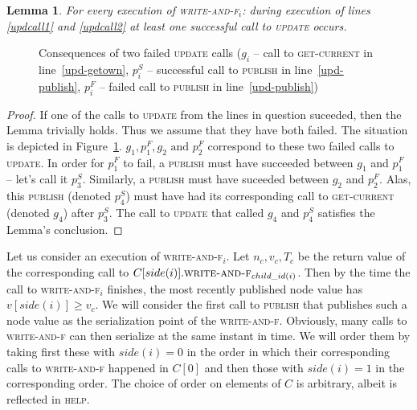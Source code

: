 \documentclass[a4paper,11pt]{article}
\newcommand{\atomic}[4]{\node(lab#1) at (#3,-#4+0.5) {#2};\draw (#3,-#4-0.1) to (lab#1);\node[inner sep=0pt](#1) at (#3,-#4) {};}
\newtheorem{lemma}{Lemma}
\newcommand{\fn}[1]{\textsc{#1}}
\begin{document}
\begin{lemma}
	For every execution of \fn{write-and-f$_i$}: during execution of lines \ref{updcall1} and \ref{updcall2} at least one successful call to \fn{update} occurs.
\end{lemma}
\begin{figure}
\caption{Consequences of two failed \fn{update} calls ($g_i$ -- call to \fn{get-current} in line~\ref{upd-getown}, $p^S_{i}$ -- successful call to \fn{publish} in line~\ref{upd-publish}, $p^F_{i}$ -- failed call to \fn{publish} in line~\ref{upd-publish})}
\label{fig-only-two-pubs}
\end{figure}

\begin{proof}
	If one of the calls to \fn{update} from the lines in question suceeded, then the Lemma trivially holds. Thus we assume that they have both failed. The situation is depicted
	in Figure~\ref{fig-only-two-pubs}. $g_1, p^F_1, g_2 \text{ and } p^F_2$ correspond to these two failed calls to \fn{update}. In order for $p^F_1$ to fail, a \fn{publish} must have
	succeeded between $g_1$ and $p^F_1$ -- let's call it $p^S_3$. Similarly, a \fn{publish} must have suceeded between $g_2$ and $p^F_2$. Alas, this \fn{publish} (denoted $p^S_4$) must have had
	its corresponding call to \fn{get-current} (denoted $g_4$) after $p^S_3$. The call to \fn{update} that called $g_4$ and $p^S_4$ satisfies the Lemma's conclusion.
\end{proof}

Let us consider an execution of \fn{write-and-f$_i$}. Let $n_c, v_c, T_c$ be the return value of the corresponding call to $C[side(i)].\fn{write-and-f$_{child\_id(i)}$}$. Then by the time the call to
\fn{write-and-f$_i$} finishes, the most recently published node value has $v[side(i)] \geq v_c$. We will consider the first call to \fn{publish} that publishes such a node value as the serialization
point of the \fn{write-and-f}. Obviously, many calls to \fn{write-and-f} can then serialize at the same instant in time. We will order them by taking first these with $side(i) = 0$ in the order in which
their corresponding calls to \fn{write-and-f} happened in $C[0]$ and then those with $side(i) = 1$ in the corresponding order. The choice of order on elements of $C$ is arbitrary, albeit is reflected
in \fn{help}.
\end{document}
